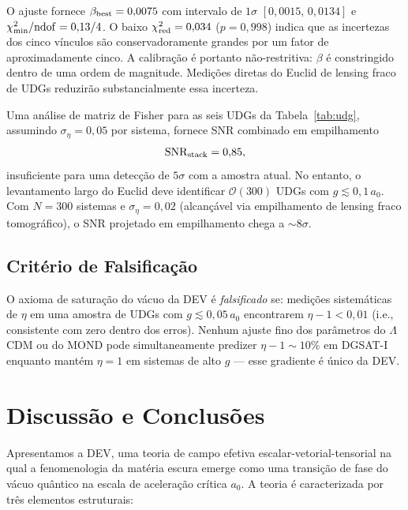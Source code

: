 \documentclass[aps,prd,twocolumn,showpacs,superscriptaddress]{revtex4-2}
\newcommand{\aO}{a_0}
\newcommand{\LCDM}{$\Lambda$CDM}
\begin{document}
O ajuste fornece $\beta_{\rm best} = 0{,}0075$ com intervalo de
$1\sigma$ $[0{,}0015,\, 0{,}0134]$ e $\chi^2_{\rm min}/{\rm ndof} = 0{,}13/4$.
O baixo $\chi^2_{\rm red} = 0{,}034$ ($p = 0{,}998$) indica que as
incertezas dos cinco vínculos são conservadoramente grandes por
um fator de aproximadamente cinco.
A calibração é portanto não-restritiva: $\beta$ é constringido
dentro de uma ordem de magnitude.
Medições diretas do Euclid de lensing fraco de UDGs reduzirão
substancialmente essa incerteza.

Uma análise de matriz de Fisher para as seis UDGs da
Tabela~\ref{tab:udg}, assumindo $\sigma_\eta = 0{,}05$ por sistema,
fornece SNR combinado em empilhamento
\begin{equation}
  {\rm SNR}_{\rm stack} = 0{,}85,
\end{equation}
insuficiente para uma detecção de $5\sigma$ com a amostra atual.
No entanto, o levantamento largo do Euclid deve identificar
$\mathcal{O}(300)$ UDGs com $g \lesssim 0{,}1\,\aO$.
Com $N = 300$ sistemas e $\sigma_\eta = 0{,}02$ (alcançável via
empilhamento de lensing fraco tomográfico), o SNR projetado
em empilhamento chega a ${\sim}8\sigma$.

\subsection{Critério de Falsificação}

O axioma de saturação do vácuo da DEV é \emph{falsificado} se:
medições sistemáticas de $\eta$ em uma amostra de UDGs com
$g \lesssim 0{,}05\,\aO$ encontrarem $\eta - 1 < 0{,}01$
(i.e., consistente com zero dentro dos erros).
Nenhum ajuste fino dos parâmetros do \LCDM{} ou do MOND pode
simultaneamente predizer $\eta - 1 \sim 10\%$ em DGSAT-I enquanto
mantém $\eta = 1$ em sistemas de alto $g$ — esse gradiente é
único da DEV.

\section{Discussão e Conclusões}
\label{sec:conclusion}

Apresentamos a DEV, uma teoria de campo efetiva
escalar-vetorial-tensorial na qual a fenomenologia da matéria
escura emerge como uma transição de fase do vácuo quântico na
escala de aceleração crítica $\aO$.
A teoria é caracterizada por três elementos estruturais:
\end{document}
